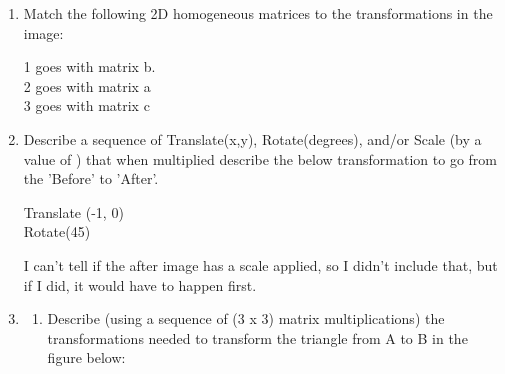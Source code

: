 \documentclass{article}
\begin{document}
\begin{enumerate}
        \item Match the following 2D homogeneous matrices to the transformations in the image:
            \begin{mdframed}
               1 goes with matrix b.\\ 
               2 goes with matrix a\\
               3 goes with matrix c
            \end{mdframed}

        \item Describe a sequence of Translate(x,y), Rotate(degrees), and/or Scale (by a value
            of ) that when multiplied describe the below transformation to go from the ’Before’
            to ’After’.

            \begin{mdframed}
                Translate (-1, 0)\\
                Rotate(45)
                
                \vspace{10pt}

                I can't tell if the after image has
                a scale applied, so I didn't include that,
                but if I did, it would have to happen first.
            \end{mdframed}

            \break
        \item 
            \begin{enumerate}
                \item Describe (using a sequence of (3 x 3) matrix multiplications) the transformations
needed to transform the triangle from A to B in the figure below:


\end{enumerate}
\end{enumerate}
\end{document}
